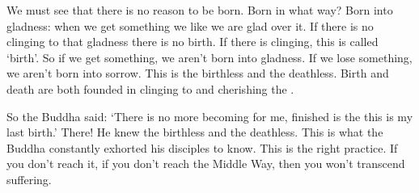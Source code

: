 We must see that there is no reason to be born. Born in what way? Born into gladness: when we get something we like we are glad over it. If there is no clinging to that gladness there is no birth. If there is clinging, this is called `birth'. So if we get something, we aren't born into gladness. If we lose something, we aren't born into sorrow. This is the birthless  and the deathless. Birth and death are both founded in clinging to and cherishing the .

So the Buddha said: `There is no more becoming for me, finished is the  this is my last birth.' There! He knew the birthless and the deathless. This is what the Buddha constantly exhorted his disciples to know. This is the right practice. If you don't reach it, if you don't reach the Middle Way, then you won't transcend suffering.

